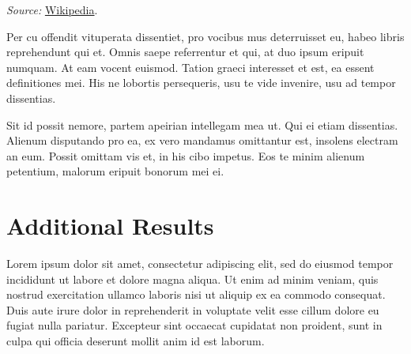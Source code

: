 \documentclass[12pt]{article}
\begin{document}
\begin{table}[tb]
\begin{threeparttable}
\begin{adjustbox}{center}
\begin{tabularx}{\textwidth}{@{}
          >{\hsize=.9\hsize}R >{\hsize}R >{\hsize}R >{\hsize=.9\hsize}R
      @{}}
        \bottomrule
      \end{tabularx}
    \end{adjustbox}

    \begin{tablenotes}\setlength{}\small
      \item \textit{Source:} \href{https://en.wikipedia.org/wiki/List_of_countries_by_population_(United_Nations)}{Wikipedia}.
    \end{tablenotes}
  \end{threeparttable}

\end{table}

Per cu offendit vituperata dissentiet, pro vocibus mus deterruisset eu, habeo libris reprehendunt qui et. Omnis saepe referrentur et qui, at duo ipsum eripuit numquam. At eam vocent euismod. Tation graeci interesset et est, ea essent definitiones mei. His ne lobortis persequeris, usu te vide invenire, usu ad tempor dissentias.

Sit id possit nemore, partem apeirian intellegam mea ut. Qui ei etiam dissentias. Alienum disputando pro ea, ex vero mandamus omittantur est, insolens electram an eum. Possit omittam vis et, in his cibo impetus. Eos te minim alienum petentium, malorum eripuit bonorum mei ei.


\newpage



\newpage
\appendix
{}
\renewcommand{\thefigure}{\Alph{section}\arabic{figure}}
\renewcommand{\thetable}{\Alph{section}\arabic{table}}

\section{Additional Results}

Lorem ipsum dolor sit amet, consectetur adipiscing elit, sed do eiusmod tempor incididunt ut labore et dolore magna aliqua. Ut enim ad minim veniam, quis nostrud exercitation ullamco laboris nisi ut aliquip ex ea commodo consequat. Duis aute irure dolor in reprehenderit in voluptate velit esse cillum dolore eu fugiat nulla pariatur. Excepteur sint occaecat cupidatat non proident, sunt in culpa qui officia deserunt mollit anim id est laborum.
\end{document}
